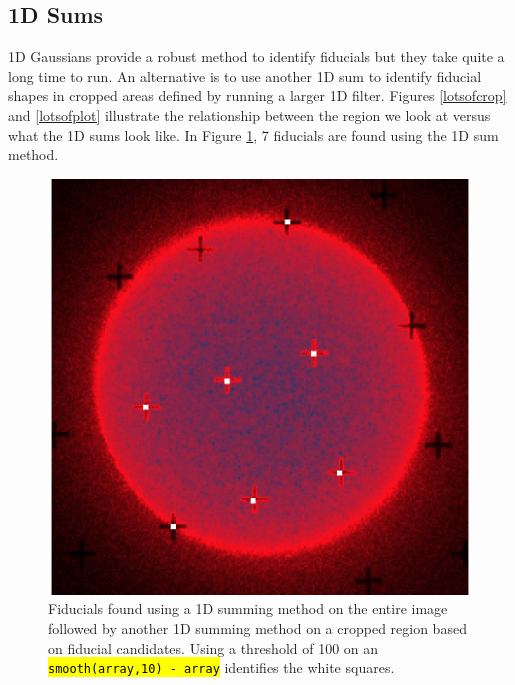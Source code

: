 \documentclass[10pt]{scrartcl}
\begin{document}




\subsection{1D Sums} %
\label{sub:1d_sums}
1D Gaussians provide a robust method to identify fiducials but they take quite a long time to run. An alternative is to use another 1D sum to identify fiducial shapes in cropped areas defined by running a larger 1D filter. Figures \ref{lotsofcrop} and \ref{lotsofplot} illustrate the relationship between the region we look at versus what the 1D sums look like. In Figure \ref{1dsumsarethebest}, 7 fiducials are found using the 1D sum method.

\begin{figure}
    \centering
    \includegraphics[width=\linewidth]{../plots_tables_images/1dsums.eps}
    \caption{Fiducials found using a 1D summing method on the entire image followed by another 1D summing method on a cropped region based on fiducial candidates. Using a threshold of 100 on an \hl{\texttt{smooth(array,10) - array}} identifies the white squares.}
    \label{1dsumsarethebest}
\end{figure}
\end{document}
